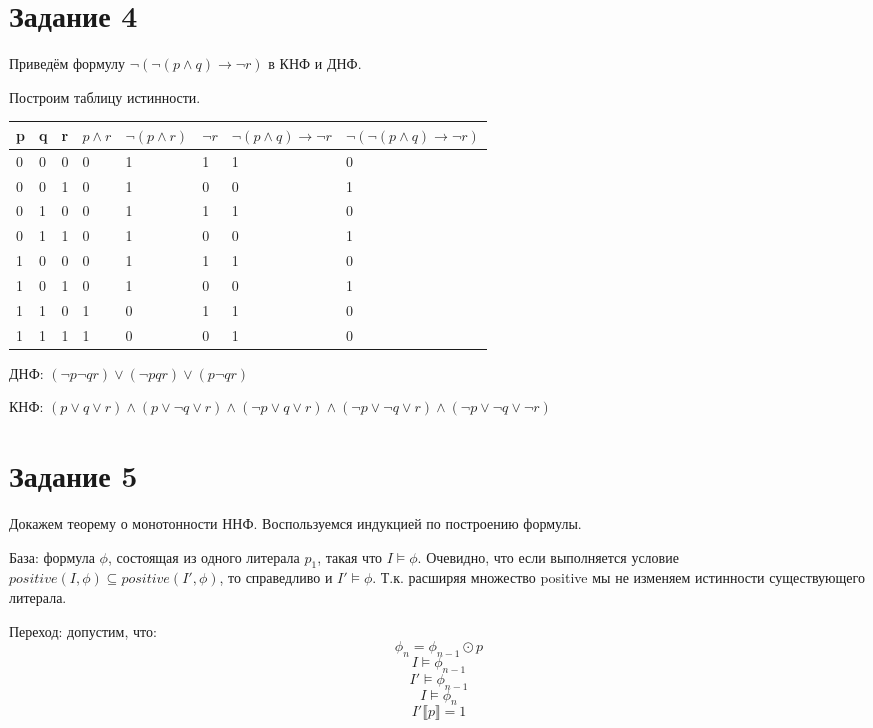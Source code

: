 \documentclass{article}
\begin{document}
\section*{Задание 4}
Приведём формулу \(\neg(\neg(p \land q) \rightarrow \neg r)\) в КНФ и ДНФ.

Построим таблицу истинности.

\begin{tabular}[b]{ | l | l | l | l | l | l | l | l |}
    \hline
    p & q & r & \(p \land r\) & \(\neg(p \land r)\) & \(\neg r\) & \(\neg(p \land q) \rightarrow \neg r\) & \(\neg(\neg(p \land q) \rightarrow \neg r)\) \\ \hline
    0 & 0 & 0 & 0 & 1 & 1 & 1 & 0 \\ \hline
    0 & 0 & 1 & 0 & 1 & 0 & 0 & 1 \\ \hline
    0 & 1 & 0 & 0 & 1 & 1 & 1 & 0 \\ \hline

    0 & 1 & 1 & 0 & 1 & 0 & 0 & 1 \\ \hline
    1 & 0 & 0 & 0 & 1 & 1 & 1 & 0 \\ \hline
    1 & 0 & 1 & 0 & 1 & 0 & 0 & 1 \\ \hline

    1 & 1 & 0 & 1 & 0 & 1 & 1 & 0 \\ \hline
    1 & 1 & 1 & 1 & 0 & 0 & 1 & 0 \\
    \hline
\end{tabular}

ДНФ: \(
    (\neg p \neg q r) 
    \lor (\neg p q r) 
    \lor (p \neg q r)
\)

КНФ: \(
    (p \lor q \lor r) 
    \land (p \lor \neg q \lor r) 
    \land (\neg p \lor q \lor r) 
    \land (\neg p \lor \neg q \lor r) 
    \land (\neg p \lor \neg q \lor \neg r)
\)

\section*{Задание 5}
Докажем теорему о монотонности ННФ.
Воспользуемся индукцией по построению формулы.

База: формула \(\phi\), состоящая из одного литерала \(p_1\), такая что
\(I \models \phi\). Очевидно, что если выполняется условие 
\(positive(I, \phi) \subseteq positive(I', \phi)\), то справедливо и \(I' \models \phi\).
Т.к. расширяя множество positive мы не изменяем истинности существующего литерала.

Переход: допустим, что: 
\[\phi_n = \phi_{n-1} \odot p\] 
\[I \models \phi_{n-1}\]
\[I' \models \phi_{n-1}\]
\[I \models \phi_{n}\]
\[I' \llbracket p \rrbracket = 1 \]
\end{document}

